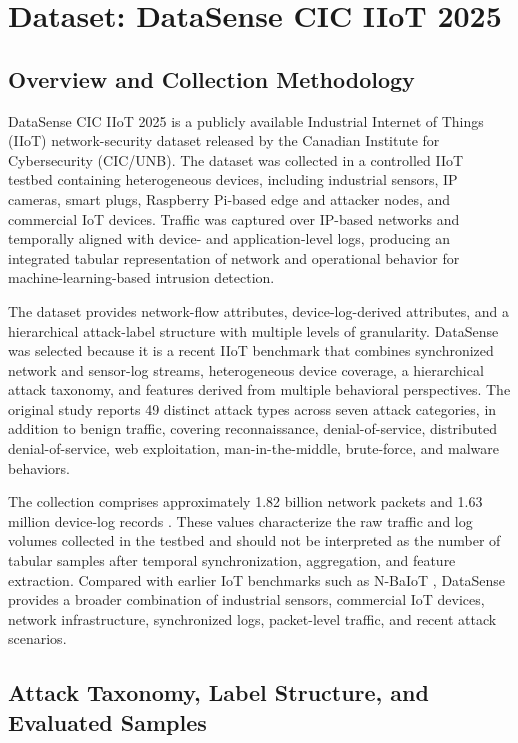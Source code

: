 \section{Dataset: DataSense CIC IIoT 2025}
\label{sec:dataset}

\subsection{Overview and Collection Methodology}

DataSense CIC IIoT 2025 \cite{firouzi2025datasense} is a publicly available Industrial Internet of Things (IIoT) network-security dataset released by the Canadian Institute for Cybersecurity (CIC/UNB). The dataset was collected in a controlled IIoT testbed containing heterogeneous devices, including industrial sensors, IP cameras, smart plugs, Raspberry Pi-based edge and attacker nodes, and commercial IoT devices. Traffic was captured over IP-based networks and temporally aligned with device- and application-level logs, producing an integrated tabular representation of network and operational behavior for machine-learning-based intrusion detection.

The dataset provides network-flow attributes, device-log-derived attributes, and a hierarchical attack-label structure with multiple levels of granularity. DataSense was selected because it is a recent IIoT benchmark that combines synchronized network and sensor-log streams, heterogeneous device coverage, a hierarchical attack taxonomy, and features derived from multiple behavioral perspectives. The original study reports 49 distinct attack types across seven attack categories, in addition to benign traffic, covering reconnaissance, denial-of-service, distributed denial-of-service, web exploitation, man-in-the-middle, brute-force, and malware behaviors.

The collection comprises approximately 1.82 billion network packets and 1.63 million device-log records \cite{firouzi2025datasense}. These values characterize the raw traffic and log volumes collected in the testbed and should not be interpreted as the number of tabular samples after temporal synchronization, aggregation, and feature extraction. Compared with earlier IoT benchmarks such as N-BaIoT \cite{meidan2018n}, DataSense provides a broader combination of industrial sensors, commercial IoT devices, network infrastructure, synchronized logs, packet-level traffic, and recent attack scenarios.

\subsection{Attack Taxonomy, Label Structure, and Evaluated Samples}

